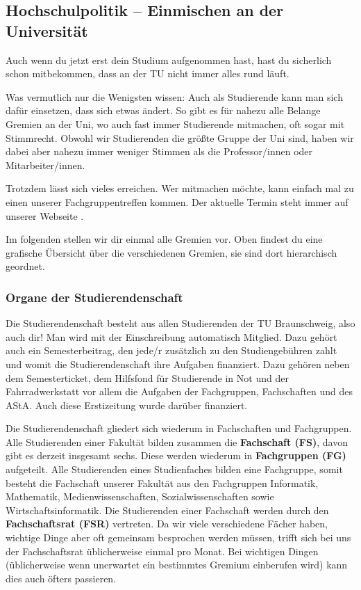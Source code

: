 
\subsection{Hochschulpolitik -- Einmischen an der Universität}

Auch wenn du jetzt erst dein Studium aufgenommen hast, hast du sicherlich schon mitbekommen, dass an der TU nicht immer alles rund läuft.

Was vermutlich nur die Wenigsten wissen: Auch als Studierende kann man sich dafür einsetzen, dass sich etwas ändert. So gibt es für nahezu alle Belange Gremien an der Uni, wo auch fast immer Studierende mitmachen, oft sogar mit Stimmrecht. Obwohl wir Studierenden die größte Gruppe der Uni sind, haben wir dabei aber nahezu immer
weniger Stimmen als die Professor/innen oder Mitarbeiter/innen. 

Trotzdem lässt sich vieles erreichen. Wer mitmachen möchte, kann einfach mal zu einen unserer Fachgruppentreffen kommen. Der aktuelle Termin steht immer auf unserer Webseite \fginfoUrl.

Im folgenden stellen wir dir einmal alle Gremien vor. Oben findest du eine grafische Übersicht über die verschiedenen Gremien, sie sind dort hierarchisch geordnet.

\subsubsection*{Organe der Studierendenschaft}

Die Studierendenschaft besteht aus allen Studierenden der TU Braunschweig, also auch dir!
Man wird mit der Einschreibung automatisch Mitglied. Dazu gehört auch ein Semesterbeitrag, den jede/r 
zusätzlich zu den Studiengebühren zahlt und womit die Studierendenschaft ihre Aufgaben finanziert. 
Dazu gehören neben dem Semesterticket, dem Hilfsfond für Studierende in Not und der 
Fahrradwerkstatt vor allem die Aufgaben der Fachgruppen, Fachschaften und des AStA. Auch diese
Erstizeitung wurde darüber finanziert.


Die Studierendenschaft gliedert sich wiederum in Fachschaften und Fachgruppen.
Alle Studierenden einer Fakultät bilden zusammen die \textbf{Fachschaft (FS)}, davon gibt es derzeit insgesamt sechs.
Diese werden wiederum in  \textbf{Fachgruppen (FG)} aufgeteilt. Alle Studierenden eines Studienfaches bilden eine Fachgruppe, 
somit besteht die Fachschaft unserer Fakultät aus den Fachgruppen Informatik, Mathematik, Medienwissenschaften, Sozialwissenschaften sowie 
Wirtschaftsinformatik. Die Studierenden einer Fachschaft werden  durch den 
\textbf{Fachschaftsrat (FSR)} vertreten. Da wir viele verschiedene Fächer haben, wichtige Dinge aber oft gemeinsam besprochen werden müssen,
trifft sich bei uns der Fachschaftsrat üblicherweise einmal pro Monat. 
Bei wichtigen Dingen (üblicherweise wenn unerwartet ein bestimmtes Gremium einberufen wird) kann dies auch öfters passieren.


